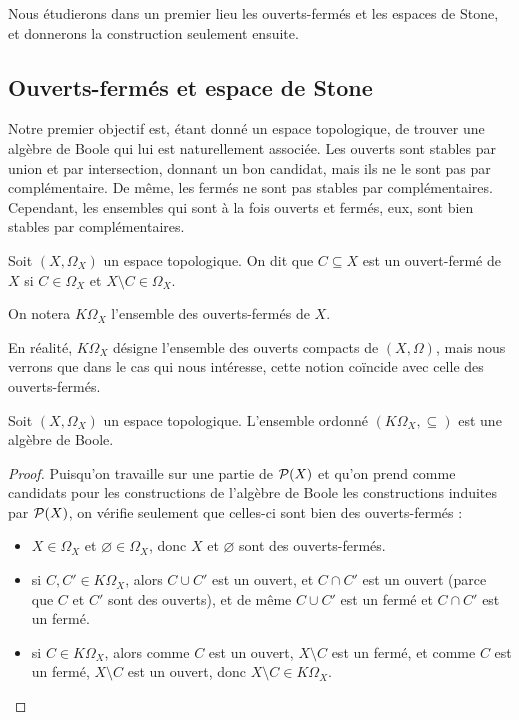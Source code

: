 Nous étudierons dans un premier lieu les ouverts-fermés et les espaces de Stone,
et donnerons la construction seulement ensuite.

\subsection{Ouverts-fermés et espace de Stone}

Notre premier objectif est, étant donné un espace topologique, de trouver une
algèbre de Boole qui lui est naturellement associée. Les ouverts sont stables
par union et par intersection, donnant un bon candidat, mais ils ne le sont pas
par complémentaire. De même, les fermés ne sont pas stables par complémentaires.
Cependant, les ensembles qui sont à la fois ouverts et fermés, eux, sont bien
stables par complémentaires.

\begin{definition}
  Soit $(X,\Omega_X)$ un espace topologique. On dit que $C\subseteq X$ est un
  ouvert-fermé de $X$ si $C\in \Omega_X$ et $X\setminus C \in \Omega_X$.

  On notera $K\Omega_X$ l'ensemble des ouverts-fermés de $X$.
\end{definition}

\begin{remark}
  En réalité, $K\Omega_X$ désigne l'ensemble des ouverts compacts de
  $(X,\Omega)$, mais nous verrons que dans le cas qui nous intéresse, cette
  notion coïncide avec celle des ouverts-fermés.
\end{remark}

\begin{property}
  Soit $(X,\Omega_X)$ un espace topologique. L'ensemble ordonné
  $(K\Omega_X,\subseteq)$ est une algèbre de Boole.
\end{property}

\begin{proof}
  Puisqu'on travaille sur une partie de $\mathcal{P}(X)$ et qu'on prend comme
  candidats pour les constructions de l'algèbre de Boole les constructions
  induites par $\mathcal{P}(X)$, on vérifie seulement que celles-ci sont bien
  des ouverts-fermés :
  \begin{itemize}
  \item $X\in\Omega_X$ et $\varnothing\in\Omega_X$, donc $X$ et $\varnothing$
    sont des ouverts-fermés.
  \item si $C,C'\in K\Omega_X$, alors $C\cup C'$ est un ouvert, et $C\cap C'$
    est un ouvert (parce que $C$ et $C'$ sont des ouverts), et de même
    $C\cup C'$ est un fermé et $C\cap C'$ est un fermé.
  \item si $C\in K\Omega_X$, alors comme $C$ est un ouvert, $X\setminus C$ est
    un fermé, et comme $C$ est un fermé, $X\setminus C$ est un ouvert, donc
    $X\setminus C \in K\Omega_X$.
  \end{itemize}
\end{proof}

